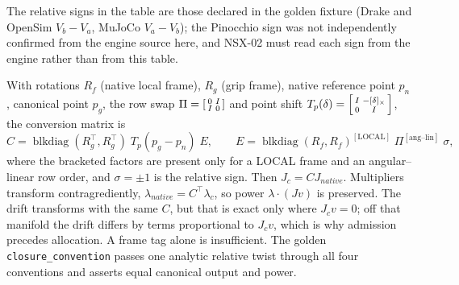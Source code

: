 \documentclass[11pt,a4paper]{article}
\newcommand{\skewm}[1]{[#1]_{\times}}
\begin{document}
The relative signs in the table are those declared in the golden
fixture (Drake and OpenSim $V_b-V_a$, MuJoCo $V_a-V_b$); the Pinocchio sign
was not independently confirmed from the engine source here, and NSX-02 must
read each sign from the engine rather than from this table.

With rotations $R_f$ (native local frame), $R_g$ (grip frame), native reference
point $p_n$, canonical point $p_g$, the row swap $\Pi=\begin{bsmallmatrix}0&I\\
I&0\end{bsmallmatrix}$ and point shift
$T_p(\delta)=\begin{bsmallmatrix}I&-\skewm{\delta}\\0&I\end{bsmallmatrix}$,
the conversion matrix is
\begin{equation}
C=\operatorname{blkdiag}(R_g^{\top},R_g^{\top})\;T_p(p_g-p_n)\;E,\qquad
E=\operatorname{blkdiag}(R_f,R_f)^{[\text{LOCAL}]}\;\Pi^{[\text{ang--lin}]}\;\sigma ,
\end{equation}
where the bracketed factors are present only for a LOCAL frame and an
angular--linear row order, and $\sigma=\pm1$ is the relative sign.  Then $J_c=CJ_{native}$.  Multipliers
transform contragrediently, $\lambda_{native}=C^{\top}\lambda_c$, so power
$\lambda\cdot(Jv)$ is preserved.  The drift transforms with the same $C$, but
that is exact only where $J_cv=0$; off that manifold the drift differs by terms
proportional to $J_cv$, which is why admission precedes allocation.  A frame
tag alone is insufficient.  The golden \texttt{closure\_convention} passes one
analytic relative twist through all four conventions and asserts equal
canonical output and power.
\end{document}
